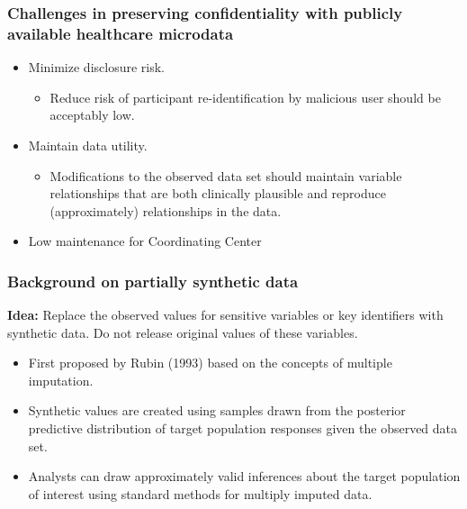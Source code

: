 \documentclass[11pt,handout]{beamer}
\begin{document}
\begin{frame}
\frametitle{Challenges in preserving confidentiality with publicly available healthcare microdata}

\begin{itemize}


\item Minimize disclosure risk. 

\begin{itemize}

  \normalsize
  
  \item Reduce risk of participant re-identification by malicious user should be acceptably low.

\end{itemize}
\medskip


\item Maintain data utility.

\begin{itemize}

  \normalsize
  
  \item Modifications to the observed data set should maintain variable relationships that are both clinically plausible and reproduce (approximately) relationships in the data.
 
\end{itemize}


\item Low maintenance for Coordinating Center

\end{itemize}

\end{frame}

\begin{frame}
\frametitle{Background on partially synthetic data}

\textbf{Idea:} Replace the observed values for sensitive variables or key identifiers with synthetic data.  Do not release original values of these variables.

\begin{itemize}

\item First proposed by Rubin (1993) based on the concepts of multiple imputation.

\item Synthetic values are created using samples drawn from the posterior predictive distribution  of target population responses given the observed data set.

\item Analysts can draw approximately valid inferences
about the target population of interest using standard methods for multiply imputed data.


\end{itemize}


\end{frame}
\end{document}

